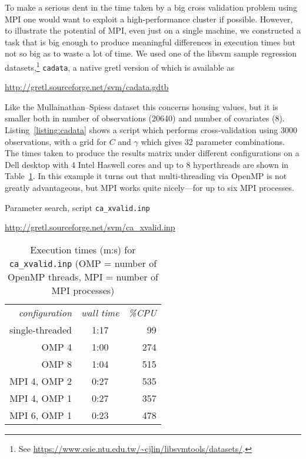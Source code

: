 \documentclass{article}
\begin{document}
To make a serious dent in the time taken by a big cross validation
problem using MPI one would want to exploit a high-performance cluster
if possible. However, to illustrate the potential of MPI, even just on
a single machine, we constructed a task that is big enough to produce
meaningful differences in execution times but not so big as to waste a
lot of time. We used one of the \textsf{libsvm} sample regression
datasets,\footnote{See
  \url{https://www.csie.ntu.edu.tw/~cjlin/libsvmtools/datasets/}.}
\texttt{cadata}, a native gretl version of which is available as

\url{http://gretl.sourceforge.net/svm/cadata.gdtb}

Like the Mullainathan--Spiess dataset this concerns housing values,
but it is smaller both in number of observations (20640) and number of
covariates (8).  Listing~\ref{listing:cadata} shows a script which
performs cross-validation using 3000 observations, with a grid for $C$
and $\gamma$ which gives 32 parameter combinations. The times taken to
produce the results matrix under different configurations on a Dell
desktop with 4 Intel Haswell cores and up to 8 hyperthreads are shown
in Table~\ref{tab:cadata}. In this example it turns out that
multi-threading via \textsf{OpenMP} is not greatly advantageous, but
MPI works quite nicely---for up to six MPI processes.

\begin{script}[htbp]
  \caption{Parameter search, script \texttt{ca\_xvalid.inp}}
  \label{listing:cadata}
  \begin{center}
    {\small
    \url{http://gretl.sourceforge.net/svm/ca_xvalid.inp}}
  \end{center}
\end{script}

\begin{table}[htbp]
\centering
\begin{tabular}{rcr}
\textit{configuration} & \textit{wall time} & \textit{\%CPU} \\
single-threaded & 1:17 & 99 \\
OMP 4 & 1:00 & 274 \\
OMP 8 & 1:04 & 515 \\
MPI 4, OMP 2 & 0:27 & 535 \\
MPI 4, OMP 1 & 0:27 & 357 \\
MPI 6, OMP 1 & 0:23 & 478
\end{tabular}
\caption{Execution times (m:s) for \texttt{ca\_xvalid.inp} (OMP =
  number of OpenMP threads, MPI = number of MPI processes)}
\label{tab:cadata}
\end{table}
\end{document}
